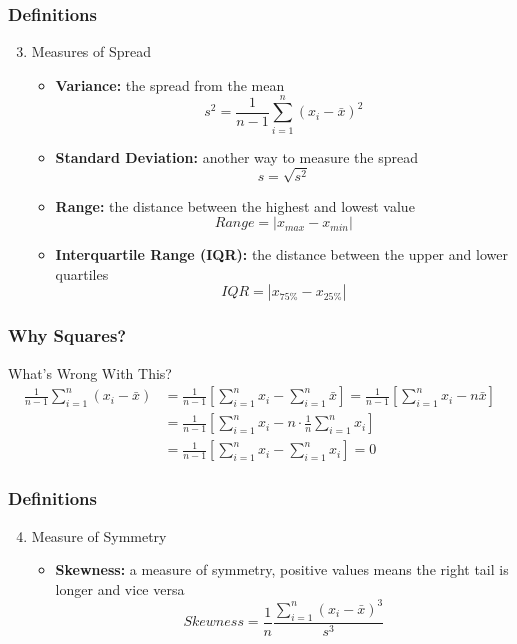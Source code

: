 \documentclass{beamer}
\begin{document}
\begin{frame}
\frametitle{Definitions}
	\begin{enumerate}
	\setcounter{enumi}{2}
		\item Measures of Spread
		\begin{itemize}
			\item \textbf{Variance:} the spread from the mean
			$$
			s^2 = \frac{1}{n-1} \sum_{i = 1}^n (x_i - \bar{x})^2
			$$
			\item \textbf{Standard Deviation:} another way to measure the spread
			$$
			s = \sqrt{s^2}
			$$
			\item \textbf{Range:} the distance between the highest and lowest value
			$$
			Range = \left| x_{max} - x_{min} \right|
			$$
			\item \textbf{Interquartile Range (IQR):} the distance between the upper and lower 					quartiles
			$$
			IQR = \left| x_{75\%} - x_{25\%} \right|
			$$
		\end{itemize}
	\end{enumerate}
\end{frame}

 \begin{frame}
 \frametitle{Why Squares?}
	 \begin{center}
	 \end{center}
	 \begin{alertblock}{What's Wrong With This?}
	 	\begin{align*}
	 		\frac{1}{n - 1} \sum_{i = 1}^n (x_i - \bar{x}) &= \frac{1}{n - 1} \left[\sum_{i = 1}^n x_i - 					\sum_{i = 1}^n \bar{x} \right] = \frac{1}{n - 1} \left[ \sum_{i = 1}^n x_i  - n\bar{x} \right]
	 		\\
	 		&= \frac{1}{n - 1} \left[ \sum_{i = 1}^n x_i  - n \cdot \frac{1}{n} \sum_{i = 1}^n x_i \right]
	 		\\ 
	 		&= \frac{1}{n - 1} \left[ \sum_{i = 1}^n x_i  -  \sum_{i = 1}^n x_i \right] = 0
	 	\end{align*}
	 \end{alertblock}
\end{frame}

\begin{frame}
\frametitle{Definitions}
	\begin{enumerate}
	\setcounter{enumi}{3}
		\item Measure of Symmetry
		\begin{itemize}
			\item \textbf{Skewness:} a measure of symmetry, positive values means the right tail is 				longer and vice versa
			$$
			Skewness = \frac{1}{n}\frac{\sum_{i = 1}^n (x_i - \bar{x})^3}{s^3}
			$$
		\end{itemize}
	\end{enumerate}
\end{frame}
\end{document}
